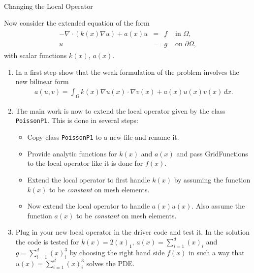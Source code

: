 \documentclass[12pt,a4paper]{article}
\begin{document}
\begin{Exercise}{Changing the Local Operator}

Now consider the extended equation of the form
\begin{align}
    \begin{array}{rcll}
      -\nabla\cdot (k(x) \nabla u) +a(x) u  & = & f & \text{ in } \Omega, \\
      u & = & g & \text{ on } \partial\Omega,
    \end{array}
\end{align}
with scalar functions $k(x)$, $a(x)$.

\begin{enumerate}
\item In a first step show that the weak formulation of the problem
  involves the new bilinear form
  \begin{align}
    a(u,v) = \int_\Omega k(x) \nabla u(x) \cdot \nabla v(x) + a(x) u(x) v(x) \,dx .
  \end{align}
\item The main work is now to extend the local operator given by the
  class \lstinline{PoissonP1}. This is done in several steps:
  \begin{itemize}
  \item Copy class \lstinline{PoissonP1} to a new file and rename it.
  \item Provide analytic functions for $k(x)$ and $a(x)$ and pass
    GridFunctions to the local operator like it is done for $f(x)$.
  \item Extend the local operator to first handle $k(x)$ by assuming the
    function $k(x)$ to be \emph{constant} on mesh elements.
  \item Now extend the local operator to handle $a(x) u(x)$. Also assume
    the function $a(x)$ to be \emph{constant} on mesh elements.
  \end{itemize}
\item Plug in your new local operator in the driver code and test it.
  In the solution the code is tested for $k(x)=2(x)_1$,
  $a(x)=\sum_{i=1}^{d}(x)_i$ and $g=\sum_{i=1}^d (x)_i^3$ by choosing
  the right hand side $f(x)$ in such a way that $u(x)=\sum_{i=1}^d
  (x)_i^3$ solves the PDE.
\end{enumerate}
\end{Exercise}
\end{document}
